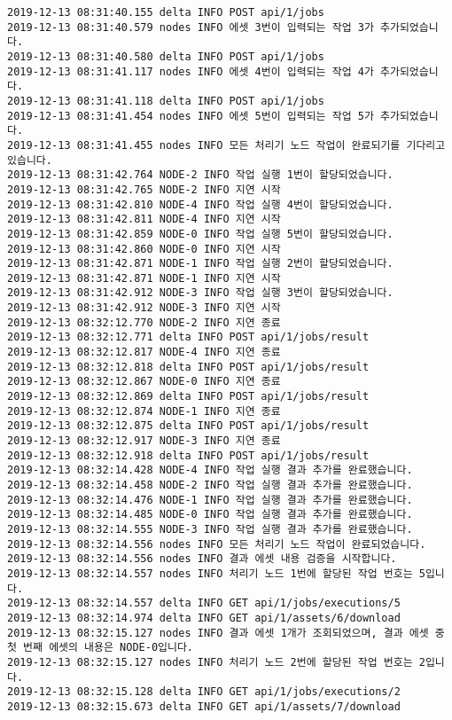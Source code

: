 \begin{Verbatim}[fontsize=\tiny, breaklines=true, breakanywhere=true]
2019-12-13 08:31:40.155 delta INFO POST api/1/jobs
2019-12-13 08:31:40.579 nodes INFO 에셋 3번이 입력되는 작업 3가 추가되었습니다.
2019-12-13 08:31:40.580 delta INFO POST api/1/jobs
2019-12-13 08:31:41.117 nodes INFO 에셋 4번이 입력되는 작업 4가 추가되었습니다.
2019-12-13 08:31:41.118 delta INFO POST api/1/jobs
2019-12-13 08:31:41.454 nodes INFO 에셋 5번이 입력되는 작업 5가 추가되었습니다.
2019-12-13 08:31:41.455 nodes INFO 모든 처리기 노드 작업이 완료되기를 기다리고 있습니다.
2019-12-13 08:31:42.764 NODE-2 INFO 작업 실행 1번이 할당되었습니다.
2019-12-13 08:31:42.765 NODE-2 INFO 지연 시작
2019-12-13 08:31:42.810 NODE-4 INFO 작업 실행 4번이 할당되었습니다.
2019-12-13 08:31:42.811 NODE-4 INFO 지연 시작
2019-12-13 08:31:42.859 NODE-0 INFO 작업 실행 5번이 할당되었습니다.
2019-12-13 08:31:42.860 NODE-0 INFO 지연 시작
2019-12-13 08:31:42.871 NODE-1 INFO 작업 실행 2번이 할당되었습니다.
2019-12-13 08:31:42.871 NODE-1 INFO 지연 시작
2019-12-13 08:31:42.912 NODE-3 INFO 작업 실행 3번이 할당되었습니다.
2019-12-13 08:31:42.912 NODE-3 INFO 지연 시작
2019-12-13 08:32:12.770 NODE-2 INFO 지연 종료
2019-12-13 08:32:12.771 delta INFO POST api/1/jobs/result
2019-12-13 08:32:12.817 NODE-4 INFO 지연 종료
2019-12-13 08:32:12.818 delta INFO POST api/1/jobs/result
2019-12-13 08:32:12.867 NODE-0 INFO 지연 종료
2019-12-13 08:32:12.869 delta INFO POST api/1/jobs/result
2019-12-13 08:32:12.874 NODE-1 INFO 지연 종료
2019-12-13 08:32:12.875 delta INFO POST api/1/jobs/result
2019-12-13 08:32:12.917 NODE-3 INFO 지연 종료
2019-12-13 08:32:12.918 delta INFO POST api/1/jobs/result
2019-12-13 08:32:14.428 NODE-4 INFO 작업 실행 결과 추가를 완료했습니다.
2019-12-13 08:32:14.458 NODE-2 INFO 작업 실행 결과 추가를 완료했습니다.
2019-12-13 08:32:14.476 NODE-1 INFO 작업 실행 결과 추가를 완료했습니다.
2019-12-13 08:32:14.485 NODE-0 INFO 작업 실행 결과 추가를 완료했습니다.
2019-12-13 08:32:14.555 NODE-3 INFO 작업 실행 결과 추가를 완료했습니다.
2019-12-13 08:32:14.556 nodes INFO 모든 처리기 노드 작업이 완료되었습니다.
2019-12-13 08:32:14.556 nodes INFO 결과 에셋 내용 검증을 시작합니다.
2019-12-13 08:32:14.557 nodes INFO 처리기 노드 1번에 할당된 작업 번호는 5입니다.
2019-12-13 08:32:14.557 delta INFO GET api/1/jobs/executions/5
2019-12-13 08:32:14.974 delta INFO GET api/1/assets/6/download
2019-12-13 08:32:15.127 nodes INFO 결과 에셋 1개가 조회되었으며, 결과 에셋 중 첫 번째 에셋의 내용은 NODE-0입니다.
2019-12-13 08:32:15.127 nodes INFO 처리기 노드 2번에 할당된 작업 번호는 2입니다.
2019-12-13 08:32:15.128 delta INFO GET api/1/jobs/executions/2
2019-12-13 08:32:15.673 delta INFO GET api/1/assets/7/download

\end{Verbatim}
